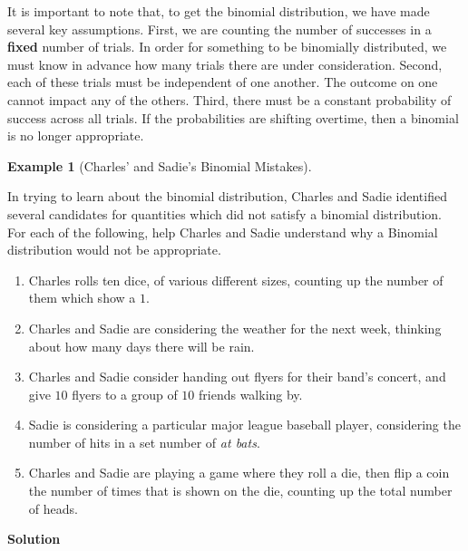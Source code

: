 \documentclass[
  letterpaper,
  DIV=11,
  numbers=noendperiod]{scrreprt}
\providecommand{\tightlist}{%
  \setlength{\itemsep}{0pt}\setlength{\parskip}{0pt}}\usepackage{longtable,booktabs,array}
\theoremstyle{definition}
\theoremstyle{definition}
\newtheorem{example}{Example}[chapter]
\theoremstyle{definition}
\theoremstyle{remark}
\begin{document}
It is important to note that, to get the binomial distribution, we have
made several key assumptions. First, we are counting the number of
successes in a \textbf{fixed} number of trials. In order for something
to be binomially distributed, we must know in advance how many trials
there are under consideration. Second, each of these trials must be
independent of one another. The outcome on one cannot impact any of the
others. Third, there must be a constant probability of success across
all trials. If the probabilities are shifting overtime, then a binomial
is no longer appropriate.

\begin{example}[Charles' and Sadie's Binomial
Mistakes]\protect\hypertarget{exm-binomial-assumption-violations}{}\label{exm-binomial-assumption-violations}

In trying to learn about the binomial distribution, Charles and Sadie
identified several candidates for quantities which did not satisfy a
binomial distribution. For each of the following, help Charles and Sadie
understand why a Binomial distribution would not be appropriate.

\begin{enumerate}
\def\labelenumi{\alph{enumi}.}
\tightlist
\item
  Charles rolls ten dice, of various different sizes, counting up the
  number of them which show a \(1\).
\item
  Charles and Sadie are considering the weather for the next week,
  thinking about how many days there will be rain.
\item
  Charles and Sadie consider handing out flyers for their band's
  concert, and give \(10\) flyers to a group of \(10\) friends walking
  by.
\item
  Sadie is considering a particular major league baseball player,
  considering the number of hits in a set number of \emph{at bats}.
\item
  Charles and Sadie are playing a game where they roll a die, then flip
  a coin the number of times that is shown on the die, counting up the
  total number of heads.
\end{enumerate}

\begin{tcolorbox}[enhanced jigsaw, colback=white, colframe=quarto-callout-color-frame, arc=.35mm, leftrule=.75mm, rightrule=.15mm, opacityback=0, breakable, bottomrule=.15mm, left=2mm, toprule=.15mm]

\vspace{-3mm}\textbf{Solution}\vspace{3mm}


\end{tcolorbox}
\end{example}
\end{document}

